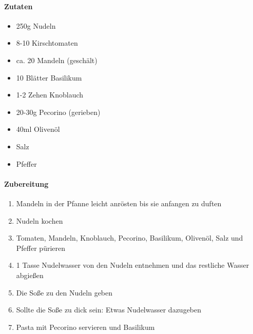 \newpage
{}
\paragraph{Zutaten}
\begin{itemize}[noitemsep]
	\item 250g Nudeln
	\item 8-10 Kirschtomaten
	\item ca. 20 Mandeln (geschält)
	\item 10 Blätter Basilikum
	\item 1-2 Zehen Knoblauch
	\item 20-30g Pecorino (gerieben)
	\item 40ml Olivenöl
	\item Salz
	\item Pfeffer
\end{itemize}
\paragraph{Zubereitung}
\begin{enumerate}[noitemsep]
	\item Mandeln in der Pfanne leicht anrösten bis sie anfangen zu duften
	\item Nudeln kochen
	\item Tomaten, Mandeln, Knoblauch, Pecorino, Basilikum, Olivenöl, Salz und Pfeffer pürieren
	\item 1 Tasse Nudelwasser von den Nudeln entnehmen und das restliche Wasser abgießen
	\item Die Soße zu den Nudeln geben
	\item Sollte die Soße zu dick sein: Etwas Nudelwasser dazugeben
	\item Pasta mit Pecorino servieren und Basilikum
\end{enumerate}
